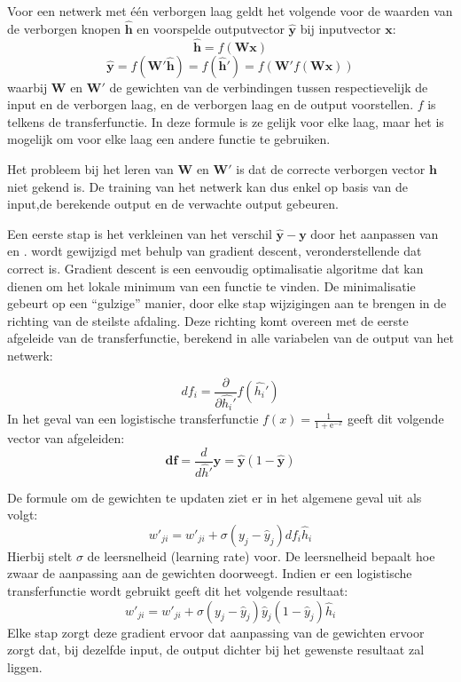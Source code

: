 Voor een netwerk met \'e\'en verborgen laag geldt het volgende voor de waarden van de verborgen knopen $\mathbf{\hat{h}}$ en voorspelde outputvector $\mathbf{\hat{y}}$ bij inputvector $\mathbf{x}$:
\begin{equation}
    \mathbf{\hat{h}} = f(\mathbf{Wx})
\end{equation}
\begin{equation}
    \boldsymbol{\hat{y}} = f(\boldsymbol{W'\hat{h}}) = f(\boldsymbol{\hat{h}'}) = f(\boldsymbol{W'}f(\boldsymbol{Wx}))
\end{equation}
waarbij $\mathbf{W}$ en $\mathbf{W'}$ de gewichten van de verbindingen tussen respectievelijk de input en de verborgen laag, en de verborgen laag en de output voorstellen. $f$ is telkens de transferfunctie. In deze formule is ze gelijk voor elke laag, maar het is mogelijk om voor elke laag een andere functie te gebruiken.

Het probleem bij het leren van $\mathbf{W}$ en $\mathbf{W'}$ is dat de correcte verborgen vector $\mathbf{h}$ niet gekend is. De training van het netwerk kan dus enkel op basis van de input,de  berekende output en de verwachte output gebeuren.

Een eerste stap is het verkleinen van het verschil $\mathbf{\hat{y}} - \mathbf{y}$ door het aanpassen van  en .  wordt gewijzigd met behulp van gradient descent, veronderstellende dat  correct is. Gradient descent is een eenvoudig optimalisatie algoritme dat kan dienen om het lokale minimum van een functie te vinden. De minimalisatie gebeurt op een ``gulzige'' manier, door elke stap wijzigingen aan te brengen in de richting van de steilste afdaling. Deze richting komt overeen met de eerste afgeleide van de transferfunctie, berekend in alle variabelen van de output van het netwerk: 

\begin{equation}
df_i = \frac{\partial}{\partial\hat{h_i}'}f(\hat{h_i}')
\end{equation}
In het geval van een logistische transferfunctie $f(x) = \frac{1}{1 + \mathrm e^{-x}}$ geeft dit volgende vector van afgeleiden:
\begin{equation}
  \mathbf{df} = \frac{d}{d\hat{h}'}\mathbf{\hat{y}} = \mathbf{\hat{y}}(1-\mathbf{\hat{y}})
\end{equation}

De formule om de gewichten te updaten ziet er in het algemene geval uit als volgt:
\begin{equation}
  w'_{ji} = w'_{ji} + \sigma(y_j-\hat{y}_j)df_i\hat{h}_i
\end{equation}
Hierbij stelt $\sigma$ de leersnelheid (learning rate) voor. De leersnelheid bepaalt hoe zwaar de aanpassing aan de gewichten doorweegt.
Indien er een logistische transferfunctie wordt gebruikt geeft dit het volgende resultaat:
\begin{equation}
    w'_{ji} = w'_{ji} + \sigma(y_j-\hat{y}_j)\hat{y}_j(1-\hat{y}_j)\hat{h}_i
\end{equation}
Elke stap zorgt deze gradient ervoor dat aanpassing van de gewichten ervoor zorgt dat, bij dezelfde input, de output dichter bij het gewenste resultaat zal liggen.


